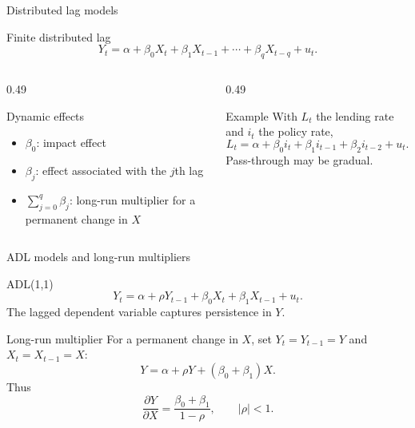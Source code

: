 \documentclass[10pt]{beamer}
\begin{document}
\begin{frame}{Distributed lag models}
\label{slide:dl}
\small
\begin{block}{Finite distributed lag}
\[
Y_t=\alpha+\beta_0X_t+\beta_1X_{t-1}+\cdots+\beta_qX_{t-q}+u_t.
\]
\end{block}

\begin{columns}[T]
\begin{column}{0.49\textwidth}
\begin{exampleblock}{Dynamic effects}
\begin{itemize}
  \item $\beta_0$: impact effect
  \item $\beta_j$: effect associated with the $j$th lag
  \item $\sum_{j=0}^{q}\beta_j$: long-run multiplier for a permanent change in $X$
\end{itemize}
\end{exampleblock}
\end{column}
\begin{column}{0.49\textwidth}
\begin{alertblock}{Example}
With $L_t$ the lending rate and $i_t$ the policy rate,
\[
L_t=\alpha+\beta_0 i_t+\beta_1 i_{t-1}+\beta_2 i_{t-2}+u_t.
\]
Pass-through may be gradual.
\end{alertblock}
\end{column}
\end{columns}
\end{frame}

\begin{frame}{ADL models and long-run multipliers}
\label{slide:adl_lrm}
\small
\begin{block}{ADL(1,1)}
\[
Y_t=\alpha+\rho Y_{t-1}+\beta_0X_t+\beta_1X_{t-1}+u_t.
\]
The lagged dependent variable captures persistence in $Y$.
\end{block}

\pause
\begin{block}{Long-run multiplier}
For a permanent change in $X$, set $Y_t=Y_{t-1}=Y$ and $X_t=X_{t-1}=X$:
\[
Y=\alpha+\rho Y+(\beta_0+\beta_1)X.
\]
Thus
\[
\frac{\partial Y}{\partial X}
=\frac{\beta_0+\beta_1}{1-\rho},
\qquad |\rho|<1.
\]
\end{block}

\hfill\hyperlink{app:adl-lrm}{}
\end{frame}
\end{document}
